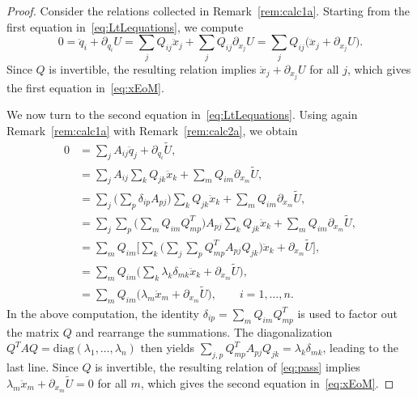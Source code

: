 \documentclass{rendiconti}
\begin{document}
\begin{proof}
Consider the relations collected in Remark~\ref{rem:calc1a}.
Starting from the first equation in~\eqref{eq:LtLequations}, we compute
\begin{equation}
0=\textstyle\ddot q_i + \partial_{q_i} U=\sum_{j}Q_{ij} \ddot x_j+\sum_j Q_{ij}\partial_{x_j}U=\sum_{j}Q_{ij} \big(\ddot x_j+\partial_{x_j}U\big).
\end{equation}
Since $Q$ is invertible, the resulting relation implies
$\ddot x_j+\partial_{x_j}U$ for all $j$, which gives the
first equation in~\eqref{eq:xEoM}.

We now turn to the second equation in~\eqref{eq:LtLequations}.
Using again Remark~\ref{rem:calc1a} with Remark~\ref{rem:calc2a}, we obtain
\begin{equation}
\label{eq:pass}
\textstyle
\begin{aligned}
\textstyle
0 &=\textstyle  \sum_{j} A_{ij} \ddot q_j + \partial_{q_i} \widetilde U,\\
&= \textstyle\sum_{j} A_{ij} \sum_{k}Q_{jk} \ddot x_k + \sum_mQ_{im}\partial_{x_m} \widetilde U,\\
&=\textstyle\sum_{j} \big(\sum_p \delta_{ip} A_{pj}\big) \sum_{k}Q_{jk} \ddot x_k + \sum_mQ_{im}\partial_{x_m} \widetilde U,\\
&=\textstyle\sum_{j} \sum_p \big(\sum_mQ_{im}Q^T_{mp}\big) A_{pj} \sum_{k}Q_{jk} \ddot x_k + \sum_mQ_{im}\partial_{x_m} \widetilde U,\\
&= \textstyle \sum_mQ_{im}\big[\sum_k\big(\sum_{j}\sum_pQ^T_{mp}A_{pj}Q_{jk}\big)\ddot x_k+\partial_{x_m} \widetilde U\big],\\
&= \textstyle \sum_mQ_{im}\big(\sum_k\lambda_k \delta_{mk}\ddot x_k+\partial_{x_m} \widetilde U\big),\\
&= \textstyle \sum_mQ_{im}\big(\lambda_m \ddot x_m+\partial_{x_m} \widetilde U\big), \qquad i=1,\dots,n.
\end{aligned}
\end{equation}
In the above computation, the identity
$\delta_{ip}=\sum_m Q_{im}Q^T_{mp}$ is used to factor out the matrix $Q$ and
rearrange the summations. The diagonalization $Q^T A Q=\mathrm{diag}(\lambda_1,
\dots,\lambda_n)$ then yields
$\sum_{j,p} Q^T_{mp}A_{pj}Q_{jk}=\lambda_k\delta_{mk}$, leading to the last line.
Since $Q$ is invertible, the resulting relation of \eqref{eq:pass} implies
$\lambda_m \ddot x_m+\partial_{x_m}\widetilde U=0$ for all $m$, which gives the
second equation in~\eqref{eq:xEoM}.
\end{proof}
\end{document}
